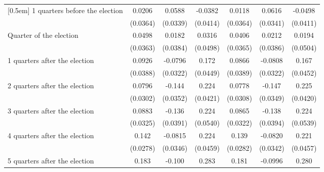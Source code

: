 \begin{table}[!ht]
\begin{tabular}{l*{6}{c}}
[0.5em]
 1 quarters before the election&      0.0206         &      0.0588         &     -0.0382         &      0.0118         &      0.0616         &     -0.0498         \\
                    &    (0.0364)         &    (0.0339)         &    (0.0414)         &    (0.0364)         &    (0.0341)         &    (0.0411)         \\
[0.5em]
Quarter of the election&      0.0498         &      0.0182         &      0.0316         &      0.0406         &      0.0212         &      0.0194         \\
                    &    (0.0363)         &    (0.0384)         &    (0.0498)         &    (0.0365)         &    (0.0386)         &    (0.0504)         \\
[0.5em]
 1 quarters after the election&      0.0926\sym{*}  &     -0.0796\sym{*}  &       0.172\sym{***}&      0.0866\sym{*}  &     -0.0808\sym{*}  &       0.167\sym{***}\\
                    &    (0.0388)         &    (0.0322)         &    (0.0449)         &    (0.0389)         &    (0.0322)         &    (0.0452)         \\
[0.5em]
 2 quarters after the election&      0.0796\sym{**} &      -0.144\sym{***}&       0.224\sym{***}&      0.0778\sym{*}  &      -0.147\sym{***}&       0.225\sym{***}\\
                    &    (0.0302)         &    (0.0352)         &    (0.0421)         &    (0.0308)         &    (0.0349)         &    (0.0420)         \\
[0.5em]
 3 quarters after the election&      0.0883\sym{**} &      -0.136\sym{***}&       0.224\sym{***}&      0.0865\sym{**} &      -0.138\sym{***}&       0.224\sym{***}\\
                    &    (0.0325)         &    (0.0391)         &    (0.0540)         &    (0.0322)         &    (0.0394)         &    (0.0539)         \\
[0.5em]
 4 quarters after the election&       0.142\sym{***}&     -0.0815\sym{*}  &       0.224\sym{***}&       0.139\sym{***}&     -0.0820\sym{*}  &       0.221\sym{***}\\
                    &    (0.0278)         &    (0.0346)         &    (0.0459)         &    (0.0282)         &    (0.0342)         &    (0.0457)         \\
[0.5em]
 5 quarters after the election&       0.183\sym{***}&      -0.100\sym{**} &       0.283\sym{***}&       0.181\sym{***}&     -0.0996\sym{**} &       0.280\sym{***}\\

\end{tabular}
\end{table}
